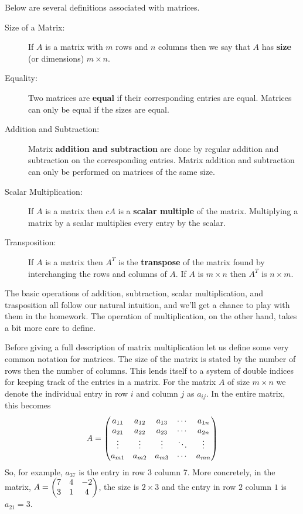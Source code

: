 \begin{definition} Below are several definitions associated with
    matrices.
    \begin{description}
        \item[Size of a Matrix:] If $A$ is a matrix with $m$ rows and $n$ columns then we
            say that $A$ has {\bf size} (or dimensions) $m \times n$.
        \item[Equality:] Two matrices are {\bf equal} if their corresponding entries are
            equal. Matrices can only be equal if the sizes are equal.
        \item[Addition and Subtraction:] Matrix {\bf addition and subtraction} are done by
            regular addition and subtraction on the corresponding entries.  Matrix
            addition and subtraction can only be performed on matrices of the same size.
        \item[Scalar Multiplication:] If $A$ is a matrix then $cA$ is a {\bf scalar
            multiple} of the matrix.  Multiplying a matrix by a scalar multiplies every
            entry by the scalar.
        \item[Transposition:] If $A$ is a matrix then $A^T$ is the {\bf transpose} of the
            matrix found by interchanging the rows and columns of $A$.  If $A$ is $m
            \times n$ then $A^T$ is $n \times m$.
    \end{description}
\end{definition}

The basic operations of addition, subtraction, scalar multiplication, and trasposition all
follow our natural intuition, and we'll get a chance to play with them in the homework.  The
operation of multiplication, on the other hand, takes a bit more care to define.

Before giving a full description of matrix multiplication let us define some very common
notation for matrices.  The size of the matrix is stated by the number of rows then the
number of columns.  This lends itself to a system of double indices for keeping track of
the entries in a matrix. For the matrix $A$ of
size $m \times n$ we denote the individual entry in row $i$ and column $j$ as $a_{ij}$.
In the entire matrix, this becomes
\[ A = \begin{pmatrix} a_{11} & a_{12} & a_{13} & \cdots & a_{1n} \\ 
    a_{21} & a_{22} & a_{23} & \cdots & a_{2n} \\
    \vdots & \vdots & \vdots & \ddots & \vdots \\
    a_{m1} & a_{m2} & a_{m3} & \cdots & a_{mn} \end{pmatrix} \]
So, for example, $a_{37}$ is the entry in row 3 column 7.  More concretely, in the matrix, $A = \begin{pmatrix} 7 & 4 & -2 \\ 3 & 1 & 4 \end{pmatrix}$,
the size is $2 \times 3$ and the entry in row $2$ column $1$ is $a_{21} = 3$.


